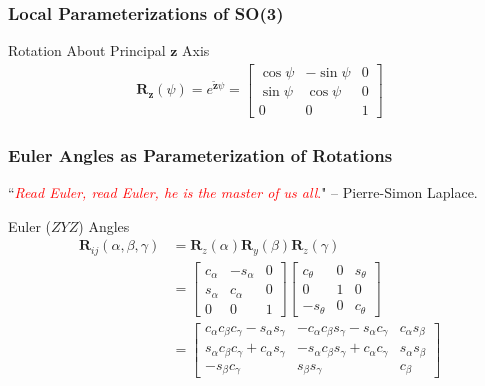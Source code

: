 \begin{frame}
	\frametitle{Local Parameterizations of SO(3)}	
	\begin{block}{Rotation About Principal $\bm{z}$ Axis}
		\begin{align}
			\bm{R}_{\bm{z}}(\psi) = e^{\bm{\tilde{z}}\psi} 
			= \begin{bmatrix}
				\cos\psi & -\sin\psi & 0\\
				\sin \psi  & \cos \psi & 0 \\
				0 & 0 & 1 
			\end{bmatrix}
		\end{align}
	\end{block}
\end{frame}

\begin{frame}
	\frametitle{Euler Angles as Parameterization of Rotations}
	``\textcolor{red}{\textit{Read Euler, read Euler, he is the master of us all}.}" -- Pierre-Simon Laplace.
	\begin{block}{Euler ($ZYZ$) Angles}
		\begin{align}
			\bm{R}_{ij}(\alpha, \beta, \gamma) &= \bm{R}_z(\alpha) \bm{R}_y(\beta) \bm{R}_z(\gamma) \\
			& = \begin{bmatrix}
				c_\alpha & -s_\alpha & 0 \\
				s_\alpha & c_\alpha & 0 \\
				0 & 0 & 1
			\end{bmatrix}
			\begin{bmatrix}
				c_\theta  & 0 & s_\theta\\
				0  & 1 & 0 \\
				-s_\theta  & 0 & c_\theta 
			\end{bmatrix} \nonumber \\
			&= \begin{bmatrix}
				c_\alpha c_\beta c_\gamma - s_\alpha s_\gamma & -c_\alpha c_\beta s_\gamma - s_\alpha c_\gamma & c_\alpha s_\beta \\
				s_\alpha c_\beta c_\gamma + c_\alpha s_\gamma & -s_\alpha c_\beta s_\gamma + c_\alpha c_\gamma  & s_\alpha s_\beta \\
				-s_\beta c_\gamma & s_\beta s_\gamma & c_\beta
			\end{bmatrix} 
			\label{eq:zyz}
		\end{align} 
	\end{block}
\end{frame}


